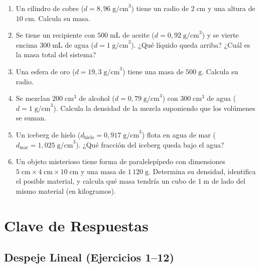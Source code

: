 \documentclass[12pt, letterpaper]{article}
\begin{document}
\begin{enumerate}[leftmargin=*, resume]
  \item \medio{} Un cilindro de cobre ($d = 8{,}96\;\text{g/cm}^3$) tiene un radio de $2\;\text{cm}$ y una altura de $10\;\text{cm}$. Calcula su masa.

  \item \medio{} Se tiene un recipiente con $500\;\text{mL}$ de aceite ($d = 0{,}92\;\text{g/cm}^3$) y se vierte encima $300\;\text{mL}$ de agua ($d = 1\;\text{g/cm}^3$). ¿Qué líquido queda arriba? ¿Cuál es la masa total del sistema?

  \item \dificil{} Una esfera de oro ($d = 19{,}3\;\text{g/cm}^3$) tiene una masa de $500\;\text{g}$. Calcula su radio.

  \item \dificil{} Se mezclan $200\;\text{cm}^3$ de alcohol ($d = 0{,}79\;\text{g/cm}^3$) con $300\;\text{cm}^3$ de agua ($d = 1\;\text{g/cm}^3$). Calcula la densidad de la mezcla suponiendo que los volúmenes se suman.

  \item \dificil{} Un iceberg de hielo ($d_{\text{hielo}} = 0{,}917\;\text{g/cm}^3$) flota en agua de mar ($d_{\text{mar}} = 1{,}025\;\text{g/cm}^3$). ¿Qué fracción del iceberg queda bajo el agua?

  \item \dificil{} Un objeto misterioso tiene forma de paralelepípedo con dimensiones $5\;\text{cm} \times 4\;\text{cm} \times 10\;\text{cm}$ y una masa de $1\,120\;\text{g}$. Determina su densidad, identifica el posible material, y calcula qué masa tendría un cubo de $1\;\text{m}$ de lado del mismo material (en kilogramos).
\end{enumerate}

\newpage

\ifmwclaves
  \section{Clave de Respuestas}

  \subsection*{Despeje Lineal (Ejercicios 1--12)}
\end{document}
